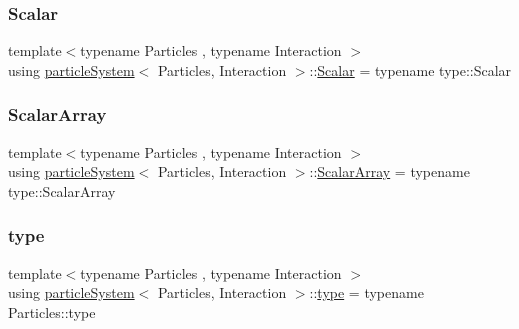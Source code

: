 \mbox{\label{classparticle_system_a3938954186247e3eab01cc75fcc62b40}} 
\subsubsection{\texorpdfstring{Scalar}{Scalar}}
{\footnotesize\ttfamily template$<$typename Particles , typename Interaction $>$ \\
using \mbox{\hyperlink{classparticle_system}{particle\+System}}$<$ Particles, Interaction $>$\+::\mbox{\hyperlink{classparticle_system_a3938954186247e3eab01cc75fcc62b40}{Scalar}} =  typename type\+::\+Scalar}

\mbox{\label{classparticle_system_a7f143d2466bd0f78d79cccd3493a756b}} 
\subsubsection{\texorpdfstring{Scalar\+Array}{ScalarArray}}
{\footnotesize\ttfamily template$<$typename Particles , typename Interaction $>$ \\
using \mbox{\hyperlink{classparticle_system}{particle\+System}}$<$ Particles, Interaction $>$\+::\mbox{\hyperlink{classparticle_system_a7f143d2466bd0f78d79cccd3493a756b}{Scalar\+Array}} =  typename type\+::\+Scalar\+Array}

\mbox{\label{classparticle_system_a7919ed2c8b419f26da20a3bd43ba5fcd}} 
\subsubsection{\texorpdfstring{type}{type}}
{\footnotesize\ttfamily template$<$typename Particles , typename Interaction $>$ \\
using \mbox{\hyperlink{classparticle_system}{particle\+System}}$<$ Particles, Interaction $>$\+::\mbox{\hyperlink{classparticle_system_a7919ed2c8b419f26da20a3bd43ba5fcd}{type}} =  typename Particles\+::type}

\mbox{\label{classparticle_system_a76c99c2b05db108a24c6e6ccbbd93af1}} 
